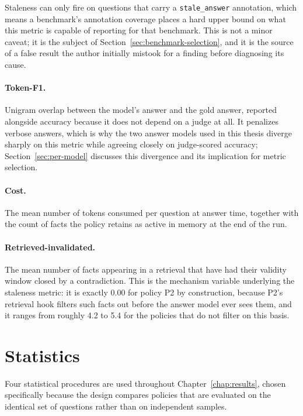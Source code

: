 Staleness can only fire on questions that carry a \texttt{stale\_answer} annotation, which means a benchmark's annotation coverage places a hard upper bound on what this metric is capable of reporting for that benchmark. This is not a minor caveat; it is the subject of Section~\ref{sec:benchmark-selection}, and it is the source of a false result the author initially mistook for a finding before diagnosing its cause.

\paragraph{Token-F1.} Unigram overlap between the model's answer and the gold answer, reported alongside accuracy because it does not depend on a judge at all. It penalizes verbose answers, which is why the two answer models used in this thesis diverge sharply on this metric while agreeing closely on judge-scored accuracy; Section~\ref{sec:per-model} discusses this divergence and its implication for metric selection.

\paragraph{Cost.} The mean number of tokens consumed per question at answer time, together with the count of facts the policy retains as active in memory at the end of the run.

\paragraph{Retrieved-invalidated.} The mean number of facts appearing in a retrieval that have had their validity window closed by a contradiction. This is the mechanism variable underlying the staleness metric: it is exactly 0.00 for policy P2 by construction, because P2's retrieval hook filters such facts out before the answer model ever sees them, and it ranges from roughly 4.2 to 5.4 for the policies that do not filter on this basis.

\section{Statistics}
\label{sec:statistics}

Four statistical procedures are used throughout Chapter~\ref{chap:results}, chosen specifically because the design compares policies that are evaluated on the identical set of questions rather than on independent samples.

